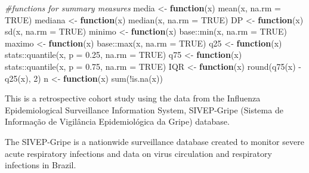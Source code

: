 \documentclass[
]{article}
\newenvironment{Shaded}{\begin{snugshade}}{\end{snugshade}}
\newcommand{\AttributeTok}[1]{\textcolor[rgb]{0.77,0.63,0.00}{#1}}
\newcommand{\CommentTok}[1]{\textcolor[rgb]{0.56,0.35,0.01}{\textit{#1}}}
\newcommand{\ConstantTok}[1]{\textcolor[rgb]{0.00,0.00,0.00}{#1}}
\newcommand{\ControlFlowTok}[1]{\textcolor[rgb]{0.13,0.29,0.53}{\textbf{#1}}}
\newcommand{\DecValTok}[1]{\textcolor[rgb]{0.00,0.00,0.81}{#1}}
\newcommand{\FloatTok}[1]{\textcolor[rgb]{0.00,0.00,0.81}{#1}}
\newcommand{\FunctionTok}[1]{\textcolor[rgb]{0.00,0.00,0.00}{#1}}
\newcommand{\NormalTok}[1]{#1}
\newcommand{\OtherTok}[1]{\textcolor[rgb]{0.56,0.35,0.01}{#1}}
\newcommand{\SpecialCharTok}[1]{\textcolor[rgb]{0.00,0.00,0.00}{#1}}
\begin{document}
\begin{Shaded}
\begin{Highlighting}[]
\CommentTok{\#functions for summary measures}
\NormalTok{media }\OtherTok{\textless{}{-}} \ControlFlowTok{function}\NormalTok{(x)}
  \FunctionTok{mean}\NormalTok{(x, }\AttributeTok{na.rm =} \ConstantTok{TRUE}\NormalTok{)}
\NormalTok{mediana }\OtherTok{\textless{}{-}} \ControlFlowTok{function}\NormalTok{(x)}
  \FunctionTok{median}\NormalTok{(x, }\AttributeTok{na.rm =} \ConstantTok{TRUE}\NormalTok{)}
\NormalTok{DP }\OtherTok{\textless{}{-}} \ControlFlowTok{function}\NormalTok{(x)}
  \FunctionTok{sd}\NormalTok{(x, }\AttributeTok{na.rm =} \ConstantTok{TRUE}\NormalTok{)}
\NormalTok{minimo }\OtherTok{\textless{}{-}} \ControlFlowTok{function}\NormalTok{(x)}
\NormalTok{  base}\SpecialCharTok{::}\FunctionTok{min}\NormalTok{(x, }\AttributeTok{na.rm =} \ConstantTok{TRUE}\NormalTok{)}
\NormalTok{maximo }\OtherTok{\textless{}{-}} \ControlFlowTok{function}\NormalTok{(x)}
\NormalTok{  base}\SpecialCharTok{::}\FunctionTok{max}\NormalTok{(x, }\AttributeTok{na.rm =} \ConstantTok{TRUE}\NormalTok{)}
\NormalTok{q25 }\OtherTok{\textless{}{-}} \ControlFlowTok{function}\NormalTok{(x)}
\NormalTok{  stats}\SpecialCharTok{::}\FunctionTok{quantile}\NormalTok{(x, }\AttributeTok{p =} \FloatTok{0.25}\NormalTok{, }\AttributeTok{na.rm =} \ConstantTok{TRUE}\NormalTok{)}
\NormalTok{q75 }\OtherTok{\textless{}{-}} \ControlFlowTok{function}\NormalTok{(x)}
\NormalTok{  stats}\SpecialCharTok{::}\FunctionTok{quantile}\NormalTok{(x, }\AttributeTok{p =} \FloatTok{0.75}\NormalTok{, }\AttributeTok{na.rm =} \ConstantTok{TRUE}\NormalTok{)}
\NormalTok{IQR }\OtherTok{\textless{}{-}} \ControlFlowTok{function}\NormalTok{(x)}
  \FunctionTok{round}\NormalTok{(}\FunctionTok{q75}\NormalTok{(x) }\SpecialCharTok{{-}} \FunctionTok{q25}\NormalTok{(x), }\DecValTok{2}\NormalTok{)}
\NormalTok{n }\OtherTok{\textless{}{-}} \ControlFlowTok{function}\NormalTok{(x)}
  \FunctionTok{sum}\NormalTok{(}\SpecialCharTok{!}\FunctionTok{is.na}\NormalTok{(x))}
\end{Highlighting}
\end{Shaded}

This is a retrospective cohort study using the data from the Influenza
Epidemiological Surveillance Information System, SIVEP-Gripe (Sistema de
Informação de Vigilância Epidemiológica da Gripe) database.

The SIVEP-Gripe is a nationwide surveillance database created to monitor
severe acute respiratory infections and data on virus circulation and
respiratory infections in Brazil.
\end{document}
